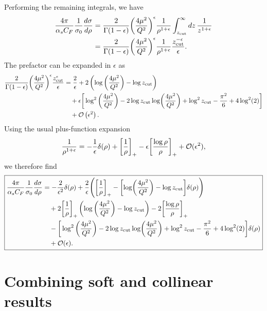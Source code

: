 \documentclass[11pt,twoside,reqno]{amsart}
\theoremstyle{plain}
\theoremstyle{remark}
\theoremstyle{definition}
\theoremstyle{remark}
\theoremstyle{definition}
\theoremstyle{definition}
\newcommand{\cO}{\mathcal{O}}
\newcommand{\zcut}{z_\mathrm{cut}}
\begin{document}
	Performing the remaining integrals, we have
	\begin{align}
		\frac{4\pi}{\alpha_s C_F}\frac{1}{\sigma_0} \frac{d\sigma}{d\rho} &= \frac{2}{\Gamma(1 - \epsilon)} \qty(\frac{4 \mu^2}{Q^2})^\epsilon \frac{1}{\rho^{1+\epsilon}} \int_{\zcut}^\infty dz \,\frac{1}{z^{1 + \epsilon}} \\
		&=  \frac{2}{\Gamma(1 - \epsilon)} \qty(\frac{4 \mu^2}{Q^2})^\epsilon \frac{1}{\rho^{1+\epsilon}} \frac{\zcut^{-\epsilon}}{\epsilon}.
	\end{align}
	The prefactor can be expanded in $\epsilon$ as
	\begin{equation}
	\begin{aligned}
		\frac{2}{\Gamma(1 - \epsilon)} \qty(\frac{4 \mu^2}{Q^2})^\epsilon \frac{\zcut^\epsilon}{\epsilon} &= \frac{2}{\epsilon } + 2 \left(\log \left(\frac{4 \mu ^2}{Q^2}\right)-\log\zcut\right) \\
			&\quad+ \epsilon  \bigg[\log^2 \qty(\frac{4\mu ^2}{Q^2})  - 2 \log \zcut \log(\frac{4 \mu^2}{Q^2}) + \log ^2\zcut - \frac{\pi ^2}{6}+4 \log ^2(2) \bigg] \\
			&\quad+ \cO\left(\epsilon ^2\right).
  	\end{aligned}
	\end{equation}
	Using the usual plus-function expansion
	\begin{equation}
		\frac{1}{\rho^{1 + \epsilon}} = -\frac{1}{\epsilon}\delta(\rho) + \qty[\frac{1}{\rho}]_+ - \epsilon\qty[\frac{\log\rho}{\rho}]_+ + \cO(\epsilon^2),
	\end{equation}
	we therefore find
	\begin{equation}\label{eq:soft collinear result}
	\boxed{
	\begin{aligned}
		\frac{4\pi}{\alpha_s C_F}\frac{1}{\sigma_0} \frac{d\sigma}{d\rho} &= -\frac{2}{\epsilon^2}\delta(\rho) + \frac{2}{\epsilon} \qty(\qty[\frac{1}{\rho}]_+ - \qty[\log(\frac{4\mu^2}{Q^2}) - \log\zcut]\delta(\rho)) \\
			&\quad+ 2\qty[\frac{1}{\rho}]_+ \left(\log \left(\frac{4 \mu ^2}{Q^2}\right)-\log\zcut\right) - 2\qty[\frac{\log\rho}{\rho}]_+ \\
			&\quad- \bigg[\log^2 \qty(\frac{4\mu ^2}{Q^2})  - 2 \log \zcut \log(\frac{4 \mu^2}{Q^2}) + \log ^2\zcut - \frac{\pi ^2}{6}+4 \log ^2(2) \bigg]\delta(\rho) \\
			&\quad+ \cO(\epsilon).
	\end{aligned}
	}
	\end{equation}

\section{Combining soft and collinear results}
	
\end{document}

